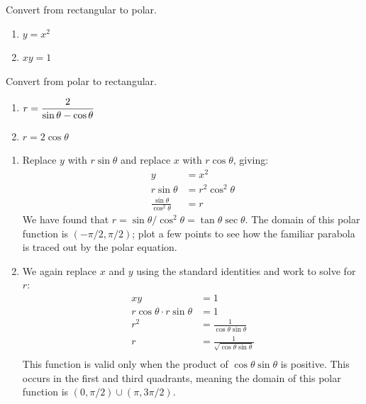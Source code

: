 \begin{example}\label{ex_polar6}%
\begin{minipage}[t]{.5\linewidth}
Convert from rectangular to polar.
\begin{enumerate}
	\item $y=x^2$
	\item $xy = 1$
\end{enumerate}
\end{minipage}%
\begin{minipage}[t]{.5\linewidth}
Convert from polar to rectangular.
\begin{enumerate}\addtocounter{enumi}{2}
	\item $\displaystyle r=\frac{2}{\sin \theta-\cos\theta}$
	\item $r=2\cos \theta$
\end{enumerate}
\end{minipage}
\solution
\begin{enumerate}
	\item Replace $y$ with $r\sin\theta$ and replace $x$ with $r\cos\theta$, giving:
	\begin{align*}
	y &=x^2\\
	r\sin\theta &= r^2\cos^2\theta\\
	\frac{\sin\theta}{\cos^2\theta} &= r
	\end{align*}
	We have found that $r=\sin\theta/\cos^2\theta = \tan\theta\sec\theta$. The domain of this polar function is $(-\pi/2,\pi/2)$; plot a few points to see how the familiar parabola is traced out by the polar equation.
	
	\item		We again replace $x$ and $y$ using the standard identities and work to solve for $r$:
	\begin{align*}
	xy &= 1 \\
	r\cos\theta\cdot r\sin\theta & = 1\\
	r^2 & = \frac{1}{\cos\theta\sin\theta}\\
	r & = \frac{1}{\sqrt{\cos\theta\sin\theta}}\\
	\end{align*}
%
%
%
	This function is valid only when the product of $\cos\theta\sin\theta$ is positive. This occurs in the first and third quadrants, meaning the domain of this polar function is $(0,\pi/2) \cup (\pi,3\pi/2)$.
	

\end{enumerate}
\end{example}
